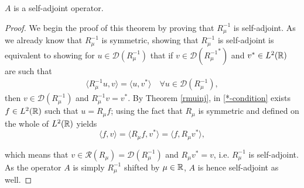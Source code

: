 \begin{theorem} \label{2.3:thm-ASelfAdjoint}
	$A$ is a self-adjoint operator.
		
	\begin{proof}
		We begin the proof of this theorem by proving that $R_{\mu}^{-1}$ is self-adjoint. As we already know that $R_{\mu}^{-1}$ is symmetric, showing that $R_{\mu}^{-1}$ is self-adjoint is equivalent to showing for $u \in \mathcal{D}(R_{\mu}^{-1})$ that if $v \in \mathcal{D}({R_{\mu}^{-1}}^{*})$ and $v^{*} \in L^{2}(\mathbb{R})$ are such that
		\begin{align}
			\langle R_{\mu}^{-1} u, v \rangle = \langle u, v^{*} \rangle \quad \forall u \in \mathcal{D}(R_{\mu}^{-1}), \label{*-condition}
		\end{align}
		then $v \in \mathcal{D}(R_{\mu}^{-1})$ and $R_{\mu}^{-1} v = v^{*}$.
		By Theorem \ref{rmuinj}, in \eqref{*-condition} exists $f \in L^{2}(\mathbb{R})$ such that $u = R_{\mu} f$; using the fact that $R_{\mu}$ is symmetric and defined on the whole of $L^{2}(\mathbb{R})$ yields
		\[  \langle f, v \rangle = \langle R_{\mu} f, v^{*} \rangle = \langle f, R_{\mu} v^{*} \rangle, \]
		
		which means that $v \in \mathcal{R}(R_{\mu}) = \mathcal{D}(R_{\mu}^{-1})$ and $R_{\mu} v^{*} = v$, i.e. $R_{\mu}^{-1}$ is self-adjoint. As the operator $A$ is simply $R_{\mu}^{-1}$ shifted by $\mu \in \mathbb{R}$, $A$ is hence self-adjoint as well.		
	\end{proof}
\end{theorem}